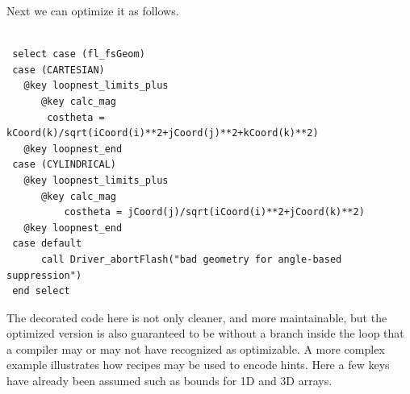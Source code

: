 \documentclass{article}
\begin{document}
Next we can optimize it as follows.
\begin{verbatim}

 select case (fl_fsGeom)
 case (CARTESIAN)
   @key loopnest_limits_plus
      @key calc_mag
       costheta = kCoord(k)/sqrt(iCoord(i)**2+jCoord(j)**2+kCoord(k)**2)
   @key loopnest_end
 case (CYLINDRICAL)
   @key loopnest_limits_plus
      @key calc_mag
          costheta = jCoord(j)/sqrt(iCoord(i)**2+jCoord(k)**2)
   @key loopnest_end
 case default
      call Driver_abortFlash("bad geometry for angle-based suppression")
 end select
\end{verbatim}

The decorated code here is not only cleaner, and more maintainable,
but the optimized version is also guaranteed to be without a branch inside the loop that a
compiler may or may not have recognized as optimizable. A
more complex example illustrates how recipes may be used to encode
hints. Here a few keys have already been assumed such as bounds for
1D and 3D arrays.
\end{document}
